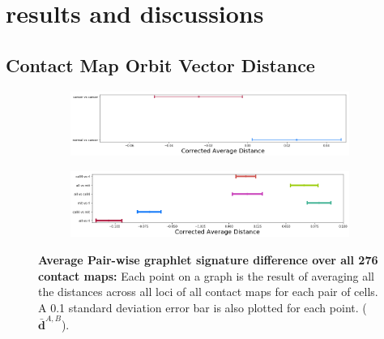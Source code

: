 \documentclass[a4,center,fleqn]{NAR}
\begin{document}
\section{results and discussions}
\subsection{Contact Map Orbit Vector Distance}
\begin{figure}
    \centering
    \begin{subfigure}[b]{.5\textwidth}
        \includegraphics[width=\textwidth]{figures/orbit_distances_normal_vs_cancer.png}
        \caption{}
        \label{fig:orbit_distances_all_a}
    \end{subfigure}

    \begin{subfigure}[b]{.5\textwidth}
        \includegraphics[width=\textwidth]{figures/orbit_distances_cells.png}
        \caption{}
        \label{fig:orbit_distances_all_b}
    \end{subfigure}

    \caption{   
        \textbf{Average Pair-wise graphlet signature difference 
        over all 276 contact maps:}
        Each point on a graph is the result of averaging all
        the distances across all loci of all contact maps for 
        each pair of cells. A 0.1 standard deviation error
        bar is also plotted for each point.
        ($\bar{\mathbf{d}}^{\scriptscriptstyle A,B}$).  
     }
    \label{fig:orbit_distances_all}
\end{figure}
\end{document}

